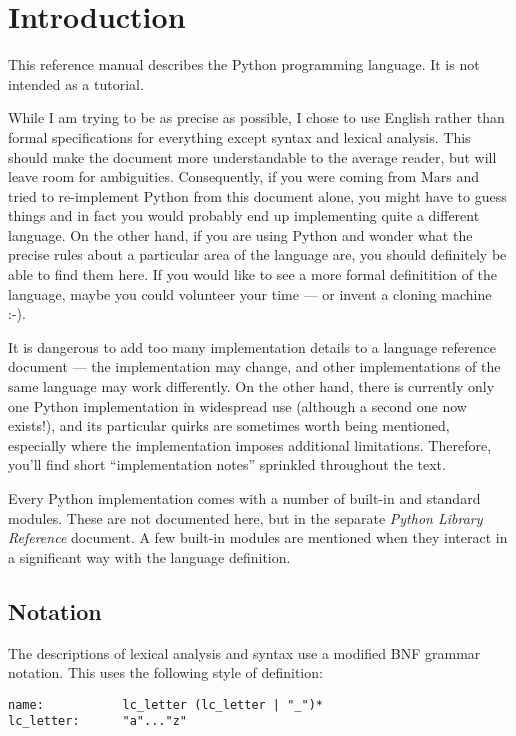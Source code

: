 \chapter{Introduction\label{introduction}}

This reference manual describes the Python programming language.
It is not intended as a tutorial.

While I am trying to be as precise as possible, I chose to use English
rather than formal specifications for everything except syntax and
lexical analysis.  This should make the document more understandable
to the average reader, but will leave room for ambiguities.
Consequently, if you were coming from Mars and tried to re-implement
Python from this document alone, you might have to guess things and in
fact you would probably end up implementing quite a different language.
On the other hand, if you are using
Python and wonder what the precise rules about a particular area of
the language are, you should definitely be able to find them here.
If you would like to see a more formal definitition of the language,
maybe you could volunteer your time --- or invent a cloning machine
:-).

It is dangerous to add too many implementation details to a language
reference document --- the implementation may change, and other
implementations of the same language may work differently.  On the
other hand, there is currently only one Python implementation in
widespread use (although a second one now exists!), and
its particular quirks are sometimes worth being mentioned, especially
where the implementation imposes additional limitations.  Therefore,
you'll find short ``implementation notes'' sprinkled throughout the
text.

Every Python implementation comes with a number of built-in and
standard modules.  These are not documented here, but in the separate
\emph{Python Library Reference} document.  A few built-in modules are
mentioned when they interact in a significant way with the language
definition.

\section{Notation\label{notation}}

The descriptions of lexical analysis and syntax use a modified BNF
grammar notation.  This uses the following style of definition:

\begin{verbatim}
name:           lc_letter (lc_letter | "_")*
lc_letter:      "a"..."z"
\end{verbatim}

